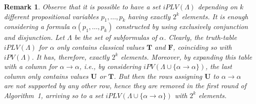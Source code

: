 \documentclass[12pt]{article}
\newtheorem{remark}[theorem]{Remark}
\newcommand{\bT}{\mathbf{T}}
\newcommand{\bU}{\mathbf{U}}
\newcommand{\bF}{\mathbf{F}}
\begin{document}
\begin{remark}
Observe that it is possible to have a set $iPLV(\Lambda)$ depending on $k$ different propositional variables $p_1,\ldots,p_k$ having {\em exactly} $2^k$ elements. It is enough considering a formula $\alpha(p_1,\ldots,p_k)$ constructed by using exclusively conjunction and disjunction. Let $\Lambda$ be the set of subformulas of $\alpha$. Clearly, the  truth-table  $iPLV(\Lambda)$ for $\alpha$  only contains classical values $\bT$ and $\bF$, coinciding so with $iPV(\Lambda)$. It has, therefore, exactly $2^k$ elements. Moreover, by expanding this table with a column for $\alpha \to \alpha$, i.e., by considering $iPV(\Lambda \cup\{\alpha \to\alpha\})$, the last column only contains values $\bU$ or $\bT$. But then the rows assigning $\bU$ to $\alpha \to \alpha$ are not supported by any other row, hence they are removed in the first round of Algorithm~1, arriving so to a set   $iPLV(\Lambda \cup\{\alpha \to\alpha\})$ with $2^k$ elements.
\end{remark}

%
%
%    
%
%
%
%    
\end{document}
